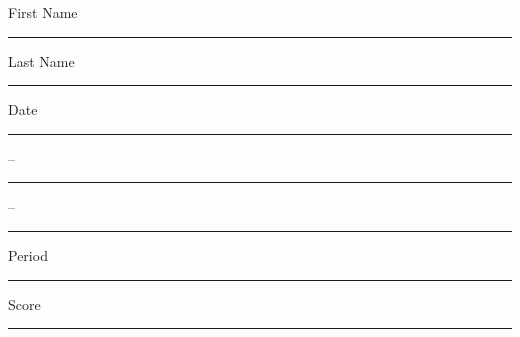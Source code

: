 
\noindent
{\large
First Name \rule{6em}{.1pt} Last Name \rule{6em}{.1pt} Date \rule{1.5em}{.1pt} -- \rule{1.5em}{.1pt} -- \rule{1.5em}{.1pt} Period \rule{2em}{.1pt} Score \rule{2em}{.1pt}
}
\vspace{1em}

